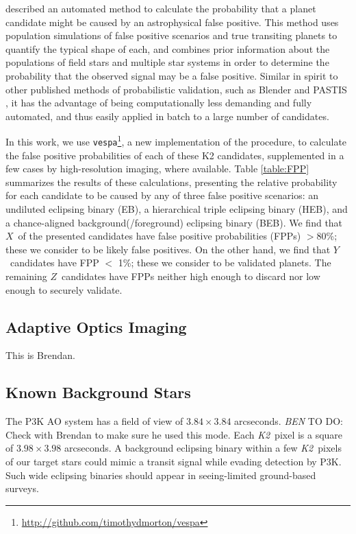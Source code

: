 \documentclass{emulateapj}
\newcommand{\project}[1]{\textsl{#1}}
\newcommand{\KT}{\project{K2}}
\newcommand{\todo}[3]{{\color{#2} \emph{#1} TO DO: #3}}
\newcommand{\btmtodo}[1]{\todo{BEN}{red}{#1}}
\newcommand{\Nfp}{$X$}
\newcommand{\Nvalidated}{$Y$}
\newcommand{\Nlimbo}{$Z$}
\begin{document}
\citet{Morton12} described an automated method to calculate the
probability that a planet candidate might be caused by an
astrophysical false positive.  This method uses population simulations
of false positive scenarios and true transiting planets to quantify
the typical shape of each, and combines prior information about the
populations of field stars and multiple star systems in order to
determine the probability that the observed signal may be a false
positive.  Similar in spirit to other published methods of
probabilistic validation, such as Blender \citep{} and PASTIS
\citep{}, it has the advantage of being computationally less demanding
and fully automated, and thus easily applied in batch to a large
number of candidates.
 
In this work, we use
\texttt{vespa}\footnote{\url{http://github.com/timothydmorton/vespa}},
a new implementation of the \citet{Morton12} procedure, to calculate
the false positive probabilities of each of these K2 candidates,
supplemented in a few cases by high-resolution imaging, where
available.  Table \ref{table:FPP} summarizes the results of these
calculations, presenting the relative probability for each candidate
to be caused by any of three false positive scenarios: an undiluted
eclipsing binary (EB), a hierarchical triple eclipsing binary (HEB),
and a chance-aligned background(/foreground) eclipsing binary (BEB).
We find that \Nfp\ of the presented candidates have false positive
probabilities (FPPs) $>$80\%; these we consider to be likely false
positives.  On the other hand, we find that \Nvalidated\ candidates
have FPP $<$ 1\%; these we consider to be validated planets.  The
remaining \Nlimbo\ candidates have FPPs neither high enough to discard
nor low enough to securely validate.

\subsection{Adaptive Optics Imaging}

This is Brendan.




\subsection{Known Background Stars}
The P3K AO system has a field of view of $3.84 \times 3.84$ arcseconds.
\btmtodo{Check with Brendan to make sure he used this mode}.
Each \KT\ pixel is a square of $3.98 \times 3.98$ arcseconds. 
A background eclipsing binary within a few \KT\ pixels of our target 
stars could mimic a transit signal while evading detection by P3K.
Such wide eclipsing binaries should appear in seeing-limited ground-based
surveys.
\end{document}
